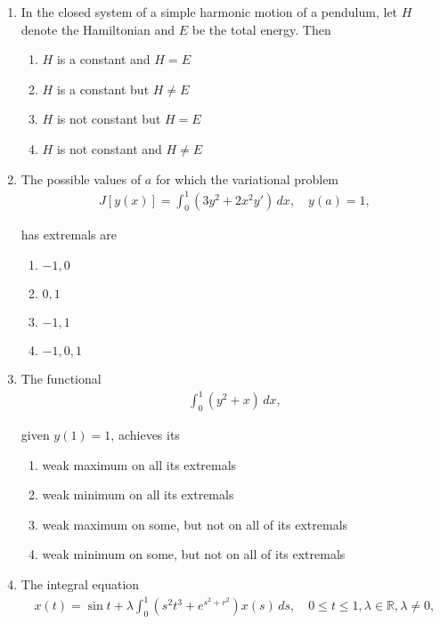 \documentclass[journal]{IEEEtran}
\numberwithin{equation}{enumi}
\numberwithin{figure}{enumi}
\begin{document}
\begin{enumerate}
\item
In the closed system of a simple harmonic motion of a pendulum, let $H$ denote the Hamiltonian and $E$ be the total energy. Then
\hfill{}
\begin{multicols}{2}
\begin{enumerate}
    \item $H$ is a constant and $H = E$
    \item $H$ is a constant but $H \neq E$
    \item $H$ is not constant but $H = E$
    \item $H$ is not constant and $H \neq E$
\end{enumerate}
\end{multicols}

\item
The possible values of $a$ for which the variational problem
\begin{align}
    J[y(x)] = \int_0^1 (3y^2 + 2x^2 y')\, dx, \quad y(a) = 1,
\end{align}

has extremals are
\hfill{}
\begin{multicols}{4}
\begin{enumerate}
    \item $-1, 0$
    \item $0, 1$
    \item $-1, 1$
    \item $-1, 0, 1$
\end{enumerate}
\end{multicols}

\item
The functional 
\begin{align}
    \int_0^1 (y^2 + x) \, dx,
\end{align}

given $y(1) = 1$, achieves its
\hfill{}

\begin{enumerate}
    \item weak maximum on all its extremals
    \item weak minimum on all its extremals
    \item weak maximum on some, but not on all of its extremals
    \item weak minimum on some, but not on all of its extremals
\end{enumerate}


\item
The integral equation
\begin{align}
    x(t) = \sin t + \lambda \int_0^1 (s^2 t^3 + e^{s^2 + r^2}) x(s) \, ds, \quad 0 \leq t \leq 1, \lambda \in \mathbb{R}, \lambda \neq 0,
\end{align}


\end{enumerate}
\end{document}
